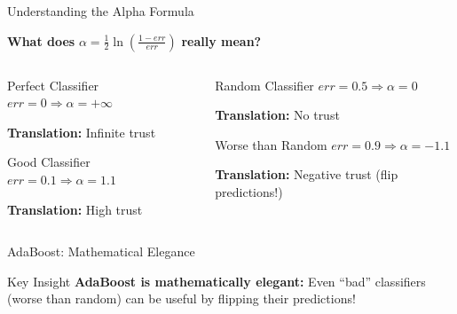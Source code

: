 \documentclass[10pt]{beamer}
\begin{document}
\begin{frame}{Understanding the Alpha Formula}
\begin{keypointsbox}
\textbf{What does } $\alpha = \frac{1}{2}\ln\left(\frac{1-err}{err}\right)$ \textbf{ really mean?}
\end{keypointsbox}

\begin{columns}
\begin{column}{0.5\textwidth}
\begin{definitionbox}{Perfect Classifier}
$err = 0 \Rightarrow \alpha = +\infty$

\textbf{Translation:} Infinite trust
\end{definitionbox}

\begin{examplebox}{Good Classifier}
$err = 0.1 \Rightarrow \alpha = 1.1$

\textbf{Translation:} High trust
\end{examplebox}
\end{column}

\begin{column}{0.5\textwidth}
\begin{alertbox}{Random Classifier}
$err = 0.5 \Rightarrow \alpha = 0$

\textbf{Translation:} No trust
\end{alertbox}

\begin{alertbox}{Worse than Random}
$err = 0.9 \Rightarrow \alpha = -1.1$

\textbf{Translation:} Negative trust (flip predictions!)
\end{alertbox}
\end{column}
\end{columns}
\end{frame}

\begin{frame}{AdaBoost: Mathematical Elegance}
\begin{examplebox}{Key Insight}
\textbf{AdaBoost is mathematically elegant:} Even ``bad'' classifiers (worse than random) can be useful by flipping their predictions!
\end{examplebox}
\end{frame}
\end{document}
